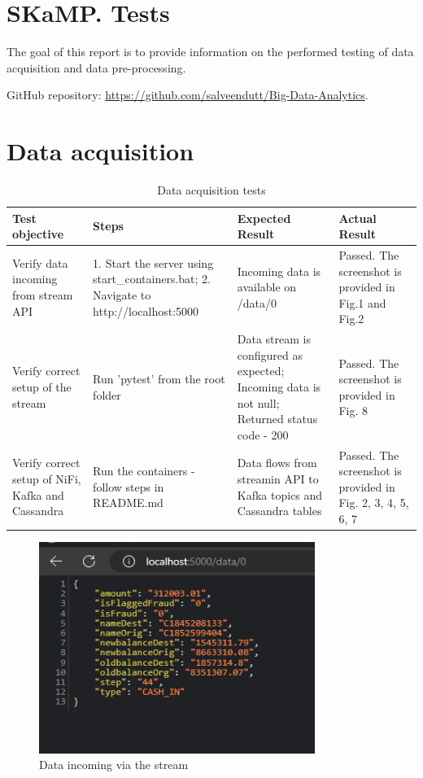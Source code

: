 \documentclass[12pt,a4paper, hidelinks]{article}
\begin{document}
\section*{SKaMP. Tests}
\vspace{\baselineskip} %

The goal of this report is to provide information on the performed testing of data acquisition and data pre-processing.

GitHub repository: \href{https://github.com/salveendutt/Big-Data-Analytics}{https://github.com/salveendutt/Big-Data-Analytics}.

\section{Data acquisition}

\begin{table}[htbp]
\centering
\begin{tabular}{|p{3cm}|p{4cm}|p{3cm}|p{5cm}|}
\hline
\textbf{Test objective} & \textbf{Steps} & \textbf{Expected Result} & \textbf{Actual Result} \\
\hline
Verify data incoming from stream API & 1. Start the server using start\_containers.bat; 2. Navigate to http://localhost:5000 & Incoming data is available on /data/0 & Passed. The screenshot is provided in Fig.1 and Fig.2 \\
\hline
Verify correct setup of the stream & Run 'pytest' from the root folder & Data stream is configured as expected; Incoming data is not null; Returned status code - 200 & Passed. The screenshot is provided in Fig. 8 \\
\hline
Verify correct setup of NiFi, Kafka and Cassandra & Run the containers - follow steps in README.md & Data flows from streamin API to Kafka topics and Cassandra tables & Passed. The screenshot is provided in Fig. 2, 3, 4, 5, 6, 7 \\
\hline
\end{tabular}
\caption{Data acquisition tests}
\end{table}

\begin{figure}[htbp]
  \centering
  \includegraphics[width=0.8\textwidth]{images/test-stream-M2.png}
  \caption{Data incoming via the stream}
  \label{fig:streaming-api}
\end{figure}
\end{document}
